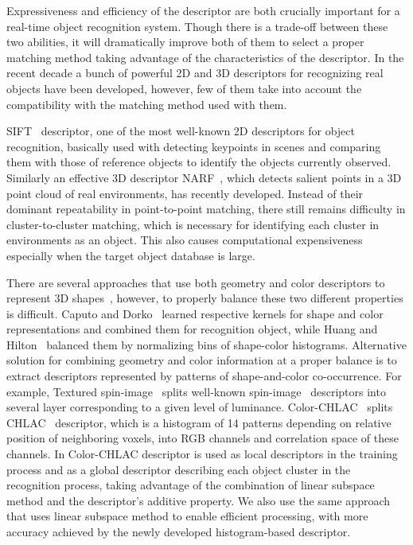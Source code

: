 \documentclass[conference]{sty/IEEEtran}
\begin{document}
Expressiveness and efficiency of the descriptor are both crucially important for a real-time object recognition system. 
Though there is a trade-off between these two abilities, it will dramatically improve both of them 
to select a proper matching method taking advantage of the characteristics of the descriptor. 
In the recent decade a bunch of powerful 2D and 3D descriptors for recognizing real objects have been developed, however, few of them take into account 
the compatibility with the matching method used with them.

SIFT~\cite{lowe04distinctive} descriptor, one of the most well-known 2D descriptors for object recognition, 
basically used with detecting keypoints in scenes and comparing them with those of reference objects to identify the objects currently observed.
Similarly an effective 3D descriptor NARF~\cite{steder10irosws}, which detects salient points in a 3D point cloud of real environments, has recently developed. 
Instead of their dominant repeatability in point-to-point matching, there still remains difficulty in cluster-to-cluster matching, 
which is necessary for identifying each cluster in environments as an object. This also causes computational expensiveness especially when the target object database is large.


There are several approaches that use both geometry and color descriptors to represent 3D shapes~\cite{park2006}, 
however, to properly balance these two different properties is difficult. 
Caputo and Dorko~\cite{caputo2002} learned respective kernels for shape and color representations and combined them for recognition object,
 while Huang and Hilton~\cite{huang2009} balanced them by normalizing bins of shape-color histograms.
Alternative solution for combining geometry and color information at a proper balance is to extract descriptors represented by patterns of shape-and-color co-occurrence.
For example, Textured spin-image~\cite{cortelazzo2006} splits well-known spin-image~\cite{Johnson_spin_images} descriptors into several layer corresponding to a given level of luminance. 
Color-CHLAC~\cite{kanezaki2010icra} splits CHLAC~\cite{kobayashi2004} descriptor, which is a histogram of 14 patterns depending on relative position of neighboring voxels, into 
RGB channels and correlation space of these channels. 
In \cite{kanezaki2010icra} Color-CHLAC descriptor is used as local descriptors in the training process and as a global descriptor describing each object cluster in the recognition process, 
   taking advantage of the combination of linear subspace method and the descriptor's additive property. 
We also use the same approach that uses linear subspace method to enable efficient processing, with more accuracy achieved by the newly developed histogram-based descriptor.
\end{document}
